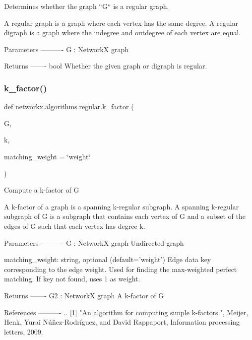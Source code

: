 \begin{DoxyVerb}Determines whether the graph ``G`` is a regular graph.

A regular graph is a graph where each vertex has the same degree. A
regular digraph is a graph where the indegree and outdegree of each
vertex are equal.

Parameters
----------
G : NetworkX graph

Returns
-------
bool
    Whether the given graph or digraph is regular.\end{DoxyVerb}
 \mbox{\label{namespacenetworkx_1_1algorithms_1_1regular_a5835cb58b6f4dc08101480865a67df98}} 
\subsubsection{\texorpdfstring{k\+\_\+factor()}{k\_factor()}}
{\footnotesize\ttfamily def networkx.\+algorithms.\+regular.\+k\+\_\+factor (\begin{DoxyParamCaption}\item[{}]{G,  }\item[{}]{k,  }\item[{}]{matching\+\_\+weight = {\ttfamily \char`\"{}weight\char`\"{}} }\end{DoxyParamCaption})}

\begin{DoxyVerb}Compute a k-factor of G

A k-factor of a graph is a spanning k-regular subgraph.
A spanning k-regular subgraph of G is a subgraph that contains
each vertex of G and a subset of the edges of G such that each
vertex has degree k.

Parameters
----------
G : NetworkX graph
  Undirected graph

matching_weight: string, optional (default='weight')
   Edge data key corresponding to the edge weight.
   Used for finding the max-weighted perfect matching.
   If key not found, uses 1 as weight.

Returns
-------
G2 : NetworkX graph
    A k-factor of G

References
----------
.. [1] "An algorithm for computing simple k-factors.",
   Meijer, Henk, Yurai Núñez-Rodríguez, and David Rappaport,
   Information processing letters, 2009.
\end{DoxyVerb}
 

